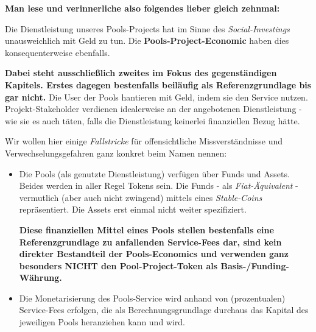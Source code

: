 \vspace{0.2cm}

\textbf{Man lese und verinnerliche also folgendes lieber gleich zehnmal:}

\vspace{0.2cm}

\begin{Abgrenzung}

\vspace{0.2cm}

Die Dienstleistung unseres Pools-Projects hat im Sinne des \textit{Social-Investings} unausweichlich mit Geld zu tun. Die \textbf{Pools-Project-Economic} haben dies konsequenterweise ebenfalls.

\vspace{0.1cm}

\textbf{Dabei steht ausschließlich zweites im Fokus des gegenständigen Kapitels. Erstes dagegen bestenfalls beiläufig als Referenzgrundlage bis gar nicht.} Die User der Pools hantieren mit Geld, indem sie den Service nutzen. Projekt-Stakeholder verdienen idealerweise an der angebotenen Dienstleistung - wie sie es auch täten, falls die Dienstleistung keinerlei finanziellen Bezug hätte.

\vspace{0.75cm}

Wir wollen hier einige \textit{Fallstricke} für offensichtliche Missverständnisse und Verwechselungsgefahren ganz konkret beim Namen nennen:

\begin{itemize}
	\item Die Pools (als genutzte Dienstleistung) verfügen über Funds und Assets. Beides werden in aller Regel Tokens sein. Die Funds - als \textit{Fiat-Äquivalent} - vermutlich (aber auch nicht zwingend) mittels eines \textit{Stable-Coins} repräsentiert. Die Assets erst einmal nicht weiter spezifiziert. 
	
	\textbf{Diese finanziellen Mittel eines Pools stellen bestenfalls eine Referenzgrundlage zu anfallenden Service-Fees dar, sind kein direkter Bestandteil der Pools-Economics und verwenden ganz besonders NICHT den Pool-Project-Token als Basis-/Funding-Währung.}
	\item Die Monetarisierung des Pools-Service wird anhand von (prozentualen) Service-Fees erfolgen, die als Berechnungsgrundlage durchaus das Kapital des je\-weiligen Pools heranziehen kann und wird. 
	

\end{itemize}
\end{Abgrenzung}
